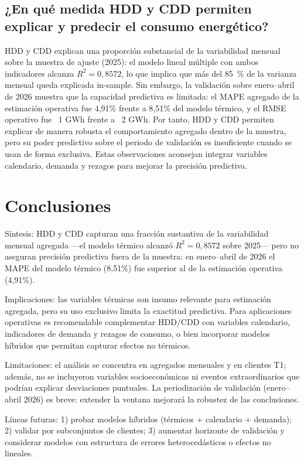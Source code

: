 \documentclass[11pt,a4paper]{article}
\begin{document}
\subsection*{¿En qué medida HDD y CDD permiten explicar y predecir el consumo energético?}
HDD y CDD explican una proporción substancial de la variabilidad mensual sobre la muestra de ajuste (2025): el modelo lineal múltiple con ambos indicadores alcanza $R^2=0{,}8572$, lo que implica que más del 85\ \% de la varianza mensual queda explicada in-sample. Sin embargo, la validación sobre enero–abril de 2026 muestra que la capacidad predictiva es limitada: el MAPE agregado de la estimación operativa fue 4,91\% frente a 8,51\% del modelo térmico, y el RMSE operativo fue ~1 GWh frente a ~2 GWh. Por tanto, HDD y CDD permiten explicar de manera robusta el comportamiento agregado dentro de la muestra, pero su poder predictivo sobre el periodo de validación es insuficiente cuando se usan de forma exclusiva. Estas observaciones aconsejan integrar variables calendario, demanda y rezagos para mejorar la precisión predictiva.

\section{Conclusiones}

Síntesis: HDD y CDD capturan una fracción sustantiva de la variabilidad mensual agregada —el modelo térmico alcanzó $R^2=0{,}8572$ sobre 2025— pero no aseguran precisión predictiva fuera de la muestra: en enero–abril de 2026 el MAPE del modelo térmico (8,51\%) fue superior al de la estimación operativa (4,91\%).

Implicaciones: las variables térmicas son insumo relevante para estimación agregada, pero su uso exclusivo limita la exactitud predictiva. Para aplicaciones operativas es recomendable complementar HDD/CDD con variables calendario, indicadores de demanda y rezagos de consumo, o bien incorporar modelos híbridos que permitan capturar efectos no térmicos.

Limitaciones: el análisis se concentra en agregados mensuales y en clientes T1; además, no se incluyeron variables socioeconómicas ni eventos extraordinarios que podrían explicar desviaciones puntuales. La periodización de validación (enero–abril 2026) es breve: extender la ventana mejorará la robustez de las conclusiones.

Líneas futuras: 1) probar modelos híbridos (térmicos + calendario + demanda); 2) validar por subconjuntos de clientes; 3) aumentar horizonte de validación y considerar modelos con estructura de errores heterocedásticos o efectos no lineales.
\end{document}
